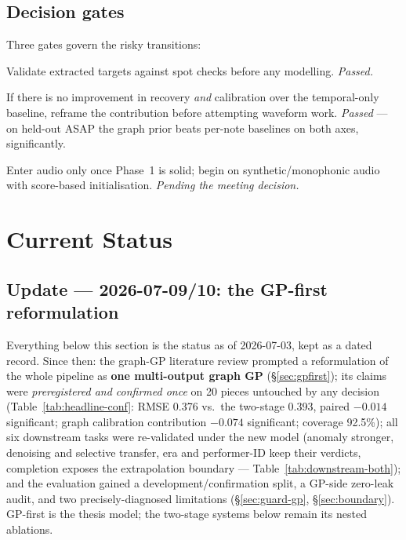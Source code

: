 \documentclass[11pt,a4paper]{report}
\newcommand{\nConfPieces}{20}
\newcommand{\rmseGP}{0.376}            %
\newcommand{\covGP}{92.5\%}
\newcommand{\rmseConfOldHead}{0.393}   %
\newcommand{\dRmseConf}{$-0.014$}      %
\newcommand{\dNllGraphConf}{$-0.074$}  %
\begin{document}
\section{Decision gates}
Three gates govern the risky transitions:
\begin{description}[leftmargin=*,style=nextline]
  \item[Gate --- Week~6 (alignment quality).] Validate extracted targets against
        spot checks before any modelling. \emph{Passed.}
  \item[Gate --- Week~10 (does the graph prior help?).] If there is no improvement
        in recovery \emph{and} calibration over the temporal-only baseline, reframe
        the contribution before attempting waveform work. \emph{Passed} --- on
        held-out ASAP the graph prior beats per-note baselines on both axes,
        significantly.
  \item[Gate --- entry to Phase~3.] Enter audio only once Phase~1 is solid; begin on
        synthetic/monophonic audio with score-based initialisation. \emph{Pending
        the meeting decision.}
\end{description}


\chapter{Current Status}\label{ch:status}

\section{Update --- 2026-07-09/10: the GP-first reformulation}
Everything below this section is the status as of 2026-07-03, kept as a dated
record. Since then: the graph-GP literature review prompted a reformulation of the
whole pipeline as \textbf{one multi-output graph GP} (\S\ref{sec:gpfirst}); its
claims were \emph{preregistered and confirmed once} on \nConfPieces{} pieces
untouched by any decision (Table~\ref{tab:headline-conf}: RMSE \rmseGP{} vs.\ the
two-stage \rmseConfOldHead, paired \dRmseConf{} significant; graph calibration
contribution \dNllGraphConf{} significant; coverage \covGP); all six downstream
tasks were re-validated under the new model (anomaly stronger, denoising and
selective transfer, era and performer-ID keep their verdicts, completion exposes
the extrapolation boundary --- Table~\ref{tab:downstream-both}); and the
evaluation gained a development/confirmation split, a GP-side
zero-leak audit, and two precisely-diagnosed limitations (\S\ref{sec:guard-gp},
\S\ref{sec:boundary}). GP-first is the thesis model; the two-stage systems below
remain its nested ablations.
\end{document}
